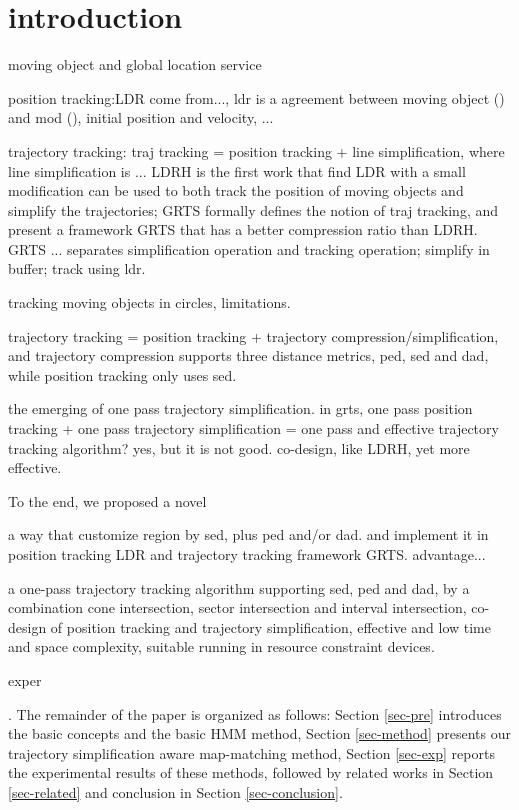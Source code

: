 

\section{introduction}
\label{sec-intro}

moving object and global location service

position tracking:LDR
come from..., ldr is a agreement between moving object () and mod (), initial position and velocity, ...

trajectory tracking: 
traj tracking = position tracking + line simplification, where line simplification is ...
LDRH is the first work that find LDR with a small modification can be used to both track the position of moving objects and simplify the trajectories; GRTS formally defines the notion of traj tracking, and present a framework GRTS that has a better compression ratio than LDRH. GRTS ... separates simplification operation and tracking operation; simplify in buffer; track using ldr.



tracking moving objects in circles, limitations.

trajectory tracking = position tracking + trajectory compression/simplification, and trajectory compression supports three distance metrics, ped, sed and dad, while position tracking only uses sed.

the emerging of one pass trajectory simplification. in grts, one pass position tracking + one pass trajectory simplification = one pass and effective trajectory tracking algorithm? yes, but it is not good. co-design, like LDRH, yet more effective.

To the end, we proposed a novel 

a way that customize region by sed, plus ped and/or dad. and implement it in position tracking LDR and trajectory tracking framework GRTS. advantage...

a one-pass trajectory tracking algorithm supporting sed, ped and dad, by a combination cone intersection, sector intersection and interval intersection, \ie co-design of position tracking and trajectory simplification, effective and low time and space complexity, suitable running in resource constraint devices.

exper

.
The remainder of the paper is organized as follows:
Section \ref{sec-pre} introduces the basic concepts and the basic HMM method,
Section \ref{sec-method} presents our trajectory simplification aware map-matching method,
Section \ref{sec-exp} reports the experimental results of these methods, followed by related works in Section \ref{sec-related} and conclusion in Section \ref{sec-conclusion}.



